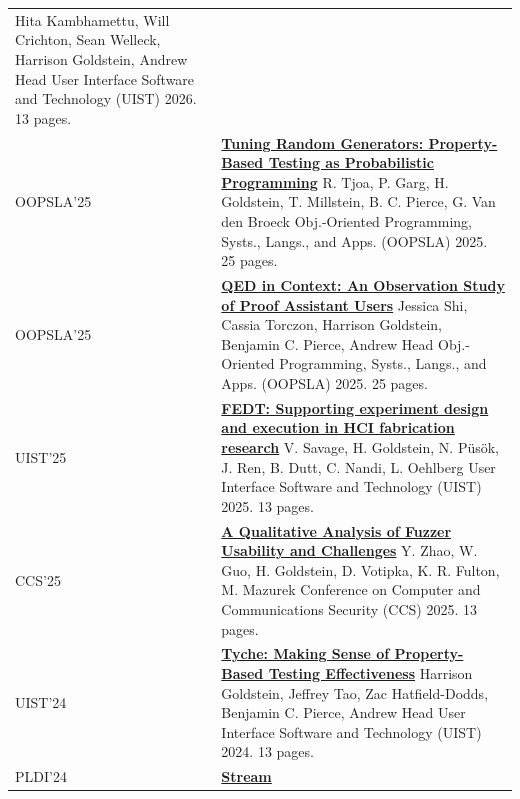\documentclass[a4paper]{article}
\newcommand{\semibf}{\fontseries{semibold}\selectfont}
\begin{document}
\begin{longtable}{@{}p{}p{}@{}}
    Hita Kambhamettu, Will Crichton, Sean Welleck, {\semibf Harrison Goldstein}, Andrew Head \newline
    User Interface Software and Technology (UIST) 2026. 13 pages. 
    \\
  OOPSLA'25 &
  \href{https://dl.acm.org/doi/abs/10.1145/3763082}{\bf Tuning Random
  Generators: Property-Based Testing as Probabilistic Programming} \newline
    R. Tjoa, P. Garg, {\semibf H. Goldstein}, T. Millstein, B. C. Pierce, G. Van den Broeck \newline
    Obj.-Oriented Programming, Systs., Langs., and Apps. (OOPSLA) 2025. 25 pages.
    \\
  OOPSLA'25 &
    \href{https://dl.acm.org/doi/10.1145/3720426}{\bf QED in Context: An Observation Study of Proof Assistant Users} \newline
    Jessica Shi, Cassia Torczon, {\semibf Harrison Goldstein}, Benjamin C. Pierce, Andrew
    Head \newline
    Obj.-Oriented Programming, Systs., Langs., and Apps. (OOPSLA) 2025. 25 pages.
    \\
  UIST'25 &
    \href{https://dl.acm.org/doi/10.1145/3746059.3747739}{\bf FEDT: Supporting
    experiment design and execution in HCI fabrication research} \newline
    V. Savage, {\semibf H. Goldstein}, N. P\"us\"ok, J. Ren, B. Dutt, C. Nandi,
    L. Oehlberg \newline
    User Interface Software and Technology (UIST) 2025. 13 pages. \\
  CCS'25 &
  \href{https://dl.acm.org/doi/10.1145/3719027.3765055}{\bf A Qualitative Analysis of Fuzzer Usability and Challenges} \newline
    Y. Zhao, W. Guo, {\semibf H. Goldstein}, D. Votipka, K. R. Fulton, M. Mazurek \newline
    Conference on Computer and Communications Security (CCS) 2025. 13 pages.
    \\
  UIST'24 &
    \href{https://dl.acm.org/doi/10.1145/3654777.3676407}{\bf Tyche: Making
    Sense of Property-Based Testing Effectiveness} \newline
    {\semibf Harrison Goldstein}, Jeffrey Tao, Zac Hatfield-Dodds, Benjamin C.
    Pierce, Andrew Head \newline
    User Interface Software and Technology (UIST) 2024. 13 pages.
    \\
  PLDI'24 &
    \href{https://dl.acm.org/doi/10.1145/3656434}{\bf Stream
}
\end{longtable}
\end{document}
